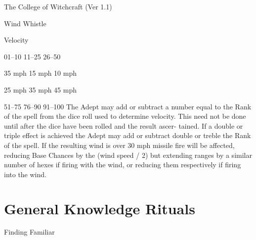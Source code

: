 \begin{Chapter}{The College of Witchcraft (Ver 1.1)}
\begin{spell}[G-13]{Wind Whistle }
\begin{effects}
Velocity 

01–10 
11–25 
26–50 

35 mph 
15 mph 
10 mph 

25 mph 
35 mph 
45 mph 

51–75 
76–90 
91–100 
The  Adept  may  add  or  subtract  a number  equal to 
the  Rank  of  the  spell  from  the  dice  roll  used  to 
determine  velocity.  This  need  not  be  done  until 
after the dice have been rolled and the result ascer-
tained.  If  a  double  or  triple  effect  is  achieved  the 
Adept  may  add  or  subtract  double  or  treble  the 
Rank  of  the  spell.  If  the  resulting  wind  is  over  30 
mph  missile  fire  will  be  affected,  reducing  Base 
Chances  by  the  (wind  speed  /  2)  but  extending 
ranges  by  a  similar  number  of  hexes  if  firing  with 
the  wind,  or  reducing  them  respectively  if  firing 
into the wind. 


\end{effects}
\end{spell}

\section{General Knowledge Rituals}

\begin{ritual}[Q-1]{Finding Familiar }


\end{ritual}
\end{Chapter}
